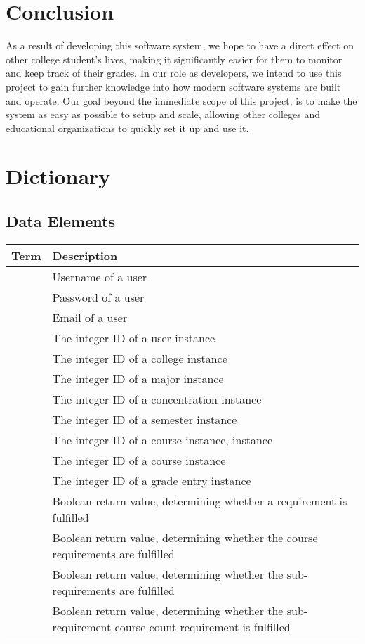 \documentclass[12pt]{article}
\newenvironment{dictionary}[1]
{
    \subsection{#1}
    \begin{table}[H]
    \begin{tabular}{ | m{\dimexpr.45\linewidth-1\tabcolsep-1.3333\arrayrulewidth}
                     | m{\dimexpr.55\linewidth-1\tabcolsep-1.3333\arrayrulewidth} | }
    \hline
    \textbf{Term} & \textbf{Description} \\ \hline
}
{
    \end{tabular}
    \end{table}
}
\newcommand{\dictitem}[2]{\detokenize{#1} & #2 \\ \hline}
\begin{document}
\section{Conclusion}
As a result of developing this software system, we hope to have a direct effect on other college
student's lives, making it significantly easier for them to monitor and keep track of their grades.
In our role as developers, we intend to use this project to gain further knowledge into how modern
software systems are built and operate. Our goal beyond the immediate scope of this project, is to
make the system as easy as possible to setup and scale, allowing other colleges and educational
organizations to quickly set it up and use it.

\section{Dictionary}
\begin{dictionary}{Data Elements}
    \dictitem{username}{Username of a user}
    \dictitem{password}{Password of a user}
    \dictitem{email}{Email of a user}
    \dictitem{user_id}{The integer ID of a user instance}
    \dictitem{college_id}{The integer ID of a college instance}
    \dictitem{major_id}{The integer ID of a major instance}
    \dictitem{concentration_id}{The integer ID of a concentration instance}
    \dictitem{semester_id}{The integer ID of a semester instance}
    \dictitem{course_instance_id}{The integer ID of a course instance, instance}
    \dictitem{course_id}{The integer ID of a course instance}
    \dictitem{grade_entry_id}{The integer ID of a grade entry instance}
    \dictitem{fulfillment_status/fulfillment_result}{Boolean return value, determining whether a
    requirement is fulfilled}
    \dictitem{course_requirement_result}{Boolean return value, determining whether the course
    requirements are fulfilled}
    \dictitem{sub_requirement_result}{Boolean return value, determining whether the
    sub-requirements are fulfilled}
    \dictitem{sub_requirement_course_count_result}{Boolean return value, determining whether the
    sub-requirement course count requirement is fulfilled}
\end{dictionary}
\end{document}
